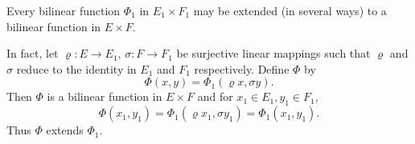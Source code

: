 Every bilinear function $\Phi_1$ in $E_1 \times F_1$ may be extended (in several ways) to a bilinear function in $E \times F$.

In fact, let $\varrho: E \rightarrow E_1$, $\sigma: F \rightarrow F_1$ be surjective linear mappings such that $\varrho$ and $\sigma$ reduce to the identity in $E_1$ and $F_1$ respectively. Define $\Phi$ by
$$\Phi(x, y) = \Phi_1(\varrho x, \sigma y).$$
Then $\Phi$ is a bilinear function in $E \times F$ and for $x_1 \in E_1, y_1 \in F_1$,
$$\Phi(x_1, y_1) = \Phi_1(\varrho x_1, \sigma y_1) = \Phi_1(x_1, y_1).$$
Thus $\Phi$ extends $\Phi_1$.

